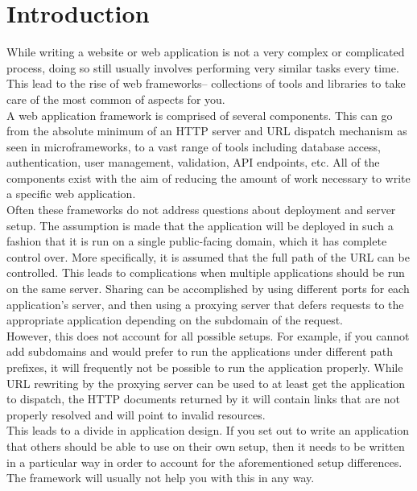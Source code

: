 \documentclass{sig-alternate-05-2015}
\begin{document}
\printccsdesc


\newpage
\section{Introduction}
While writing a website or web application is not a very complex or complicated process, doing so still usually involves performing very similar tasks every time. This lead to the rise of web frameworks-- collections of tools and libraries to take care of the most common of aspects for you. \\

A web application framework is comprised of several components. This can go from the absolute minimum of an HTTP server and URL dispatch mechanism as seen in microframeworks\cite{microframeworks}, to a vast range of tools including database access, authentication, user management, validation, API endpoints, etc. All of the components exist with the aim of reducing the amount of work necessary to write a specific web application. \\

Often these frameworks do not address questions about deployment and server setup. The assumption is made that the application will be deployed in such a fashion that it is run on a single public-facing domain, which it has complete control over. More specifically, it is assumed that the full path of the URL can be controlled. This leads to complications when multiple applications should be run on the same server. Sharing can be accomplished by using different ports for each application's server, and then using a proxying server that defers requests to the appropriate application depending on the subdomain of the request. \\

However, this does not account for all possible setups. For example, if you cannot add subdomains and would prefer to run the applications under different path prefixes, it will frequently not be possible to run the application properly. While URL rewriting by the proxying server can be used to at least get the application to dispatch, the HTTP documents returned by it will contain links that are not properly resolved and will point to invalid resources. \\

This leads to a divide in application design. If you set out to write an application that others should be able to use on their own setup, then it needs to be written in a particular way in order to account for the aforementioned setup differences. The framework will usually not help you with this in any way. \\
\end{document}

